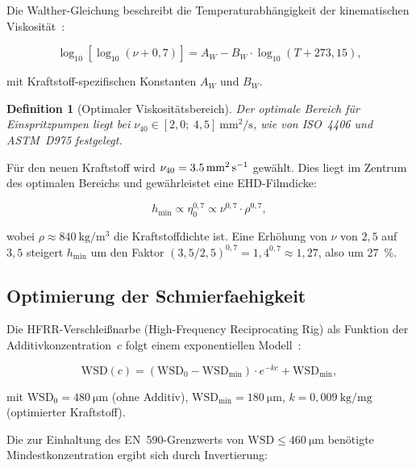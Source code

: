 ﻿\documentclass[12pt,a4paper]{article}
\newtheorem{definition}[theorem]{Definition}
\newcommand{\WSD}{\ensuremath{\mathrm{WSD}}}
\begin{document}
Die Walther-Gleichung beschreibt die Temperaturabhängigkeit der
kinematischen Viskosität~\cite{astm_d341}:

\begin{equation}
  \log_{10}\!\left[\log_{10}\!\left(\nu + 0{,}7\right)\right]
  = A_W - B_W \cdot \log_{10}\!\left(T + 273{,}15\right),
  \label{eq:walther}
\end{equation}

mit Kraftstoff-spezifischen Konstanten $A_W$ und $B_W$.

\begin{definition}[Optimaler Viskositätsbereich]
Der optimale Bereich für Einspritzpumpen liegt bei
$\nu_{40} \in [2{,}0;\ 4{,}5]\ \si{\mm\squared\per\s}$,
wie von ISO~4406 und ASTM~D975 festgelegt.
\end{definition}

Für den neuen Kraftstoff wird $\nu_{40} = \SI{3{,}5}{\mm\squared\per\s}$
gewählt. Dies liegt im Zentrum des optimalen Bereichs und gewährleistet
eine EHD-Filmdicke:

\begin{equation}
  h_{\min} \propto \eta_0^{0{,}7} \propto \nu^{0{,}7} \cdot \rho^{0{,}7},
\end{equation}

wobei $\rho \approx \SI{840}{\kg\per\m\cubed}$ die Kraftstoffdichte ist.
Eine Erhöhung von $\nu$ von $2{,}5$ auf $3{,}5$ steigert $h_{\min}$ um
den Faktor $(3{,}5/2{,}5)^{0{,}7} = 1{,}4^{0{,}7} \approx 1{,}27$,
also um \SI{27}{\percent}.

\subsection{Optimierung der Schmierfaehigkeit}
\label{sec:kraftstoff_schmierung}

Die HFRR-Verschlei\ss{}narbe (High-Frequency Reciprocating Rig) als Funktion
der Additivkonzentration~$c$ folgt einem exponentiellen Modell~\cite{kerschbaumer2002}:

\begin{equation}
  \WSD(c) = (\WSD_0 - \WSD_{\min}) \cdot e^{-k c} + \WSD_{\min},
  \label{eq:wsd_additiv}
\end{equation}

mit $\WSD_0 = \SI{480}{\micro\m}$ (ohne Additiv), $\WSD_{\min} = \SI{180}{\micro\m}$,
$k = 0{,}009\ \si{\kg\per\mg}$ (optimierter Kraftstoff).

Die zur Einhaltung des EN~590-Grenzwerts von $\WSD \leq \SI{460}{\micro\m}$
benötigte Mindestkonzentration ergibt sich durch Invertierung:
\end{document}
